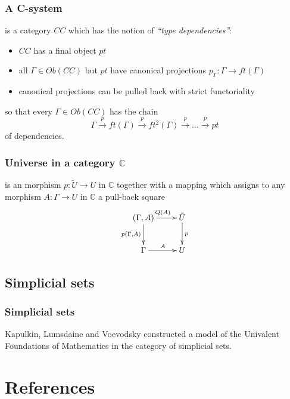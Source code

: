 \documentclass[dvipdfmx]{beamer}
\begin{document}
\begin{frame}
  \frametitle{A C-system}
  is a category $CC$ which has the notion of
  {\it ``type dependencies''}:
  \begin{itemize}
    \item $CC$ has a final object $pt$
    \item all $\Gamma \in Ob \left( CC \right)$ but $pt$
      have canonical projections
      $p_{\Gamma} : \Gamma \to ft \left( \Gamma \right)$
    \item canonical projections can be pulled back
      with strict functoriality
  \end{itemize}
  so that every $\Gamma \in Ob \left( CC \right)$
  has the chain
  \[
  \Gamma \overset{p}{\to} ft \left( \Gamma \right)
  \overset{p}{\to} ft^2 \left( \Gamma \right)
  \overset{p}{\to} \dots
  \overset{p}{\to} pt
  \]
  of dependencies.
\end{frame}

\begin{frame}
  \frametitle{Universe in a category ${\mathbb C}$}
  is an morphism $p : \tilde{U} \to U$ in ${\mathbb C}$
  together with a mapping which assigns to any morphism
  $A : \Gamma \to U$ in ${\mathbb C}$ a pull-back square
  \[
    \xymatrix{
      \left( \Gamma , A \right) \ar[r]^{Q \left( A \right)}
      \ar[d]_{p \left( \Gamma , A \right)}
        & \tilde{U} \ar[d]^{p}
        \\
        \Gamma \ar[r]^{A}
        & U
    }
  \]
\end{frame}

\subsection{Simplicial sets}

\begin{frame}
  \frametitle{Simplicial sets}
  Kapulkin, Lumsdaine and Voevodsky constructed
  a model of the Univalent Foundations of Mathematics
  in the category of simplicial sets.
  \cite{kapulkin2012simplicial,kapulkin2012univalence}
\end{frame}

%

\section{References}



\end{document}
